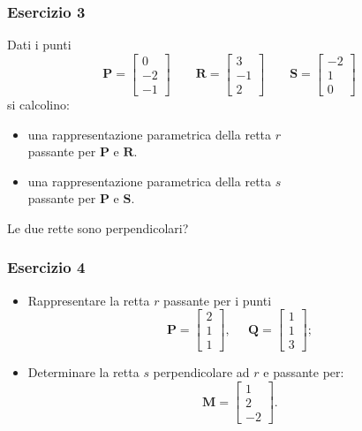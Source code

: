 \documentclass{beamer}
\begin{document}
\begin{frame}
\frametitle{Esercizio 3}
Dati i punti
$$
\mathbf{P}=\left[
\begin{array}{c}
0\\
-2\\
-1
\end{array}
\right]
\qquad
\mathbf{R}=\left[
\begin{array}{c}
3\\
-1\\
2
\end{array}
\right] \qquad
\mathbf{S}=\left[
\begin{array}{c}
-2\\
1\\
0
\end{array}
\right] 
$$
si calcolino:
    \begin{itemize}
    \item una rappresentazione parametrica della retta $r$ \\ passante per $\mathbf{P}$ e $\mathbf{R}$.
    \item una rappresentazione parametrica della retta $s$ \\ passante per $\mathbf{P}$ e $\mathbf{S}$.
    \end{itemize}
    
Le due rette sono perpendicolari?
\end{frame}

    
%
%
\begin{frame}
\frametitle{Esercizio 4}
\begin{itemize}
\item Rappresentare la retta $r$ passante per i punti
\begin{displaymath}
\mathbf{P}=\begin{bmatrix}2\\1\\1 \end{bmatrix},\;\;\;\;\;
\mathbf{Q}=\begin{bmatrix}1\\1\\3 \end{bmatrix};
\end{displaymath}
\item Determinare la retta $s$ perpendicolare ad $r$ e passante per:
\begin{displaymath}
\mathbf{M}=\begin{bmatrix}1\\2\\-2 \end{bmatrix}.
\end{displaymath}
\end{itemize}
\end{frame}
\end{document}
